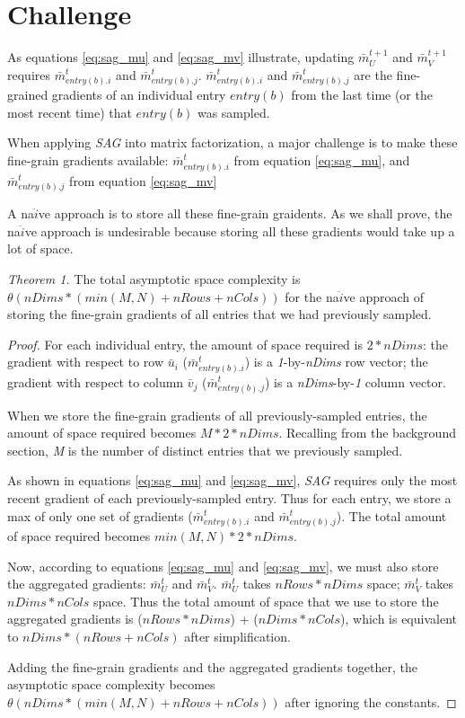 \section{Challenge}
As equations \ref{eq:sag_mu} and \ref{eq:sag_mv} illustrate, updating $\bar{m}_{U}^{t+1}$ and $\bar{m}_{V}^{t+1}$ requires $\bar{m}_{entry(b).i}^{t}$ and $\bar{m}_{entry(b).j}^{t}$.  
$\bar{m}_{entry(b).i}^{t}$ and $\bar{m}_{entry(b).j}^{t}$ are the fine-grained gradients of an individual entry $entry(b)$ from the last time (or the most recent time) that $entry(b)$ was sampled.  

When applying \emph{SAG} into matrix factorization, a major challenge is to make these fine-grain gradients available: 
$\bar{m}_{entry(b).i}^{t}$ from equation \ref{eq:sag_mu}, and 
$\bar{m}_{entry(b).j}^{t}$ from equation \ref{eq:sag_mv}  

A na$\ddot{i}$ve approach is to store all these fine-grain graidents.  
As we shall prove, the na$\ddot{i}$ve approach is undesirable because storing all these gradients would take up a lot of space.  

\emph{Theorem 1.} 
The total asymptotic space complexity is $\theta(nDims*(min(M,N)+nRows+nCols))$ for the na$\ddot{i}$ve approach of storing the fine-grain gradients of all entries that we had previously sampled.  
\begin{proof}
For each individual entry, the amount of space required is $2*nDims$:  
the gradient with respect to row $\bar{u}_i$ ($\bar{m}_{entry(b).i}^{t}$) is a \emph{1}-by-\emph{nDims} row vector;  
the gradient with respect to column $\bar{v}_j$ ($\bar{m}_{entry(b).j}^{t}$) is a \emph{nDims}-by-\emph{1} column vector.  

When we store the fine-grain gradients of all previously-sampled entries, the amount of space required becomes $M*2*nDims$.  
Recalling from the background section, \emph{M} is the number of distinct entries that we previously sampled.  

As shown in equations \ref{eq:sag_mu} and \ref{eq:sag_mv}, \emph{SAG} requires only the most recent gradient of each previously-sampled entry.
Thus for each entry, we store a max of only one set of gradients ($\bar{m}_{entry(b).i}^{t}$ and $\bar{m}_{entry(b).j}^{t}$).
The total amount of space required becomes $min(M,N)*2*nDims$.

Now, according to equations \ref{eq:sag_mu} and \ref{eq:sag_mv}, we must also store the aggregated gradients: $\bar{m}_{U}^{t}$ and $\bar{m}_{V}^{t}$.  
$\bar{m}_{U}^{t}$ takes $nRows*nDims$ space; $\bar{m}_{V}^{t}$ takes $nDims*nCols$ space.  
Thus the total amount of space that we use to store the aggregated gradients is ($nRows*nDims$) + ($nDims*nCols$), which is equivalent to $nDims*(nRows+nCols)$ after simplification. 

Adding the fine-grain gradients and the aggregated gradients together, the asymptotic space complexity becomes $\theta(nDims*(min(M,N)+nRows+nCols))$ after ignoring the constants.  
\end{proof}

